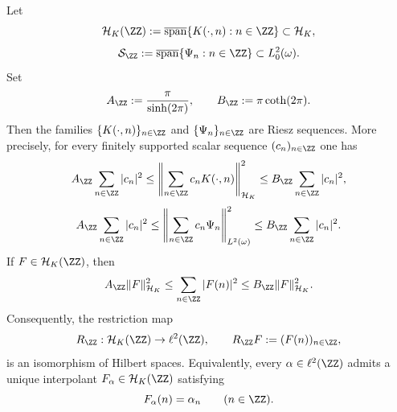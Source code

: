\begin{theorem}%
\label{thm:poisson-lattice-sampling}
Let
\[
\mathcal H_K(\ZZ)
:=
\overline{\operatorname{span}}\{K(\cdot,n):n\in\ZZ\}
\subset \mathcal H_K,
\]
\[
\mathcal S_{\ZZ}
:=
\overline{\operatorname{span}}\{\Psi_n:n\in\ZZ\}
\subset L^2_0(\omega).
\]
Set
\begin{equation}\label{eq:lattice-sampling-constants}
A_{\ZZ}:=\frac{\pi}{\sinh(2\pi)},
\qquad
B_{\ZZ}:=\pi\coth(2\pi).
\end{equation}
Then the families $\{K(\cdot,n)\}_{n\in\ZZ}$ and
$\{\Psi_n\}_{n\in\ZZ}$ are Riesz sequences.  More precisely, for every
finitely supported scalar sequence $(c_n)_{n\in\ZZ}$ one has
\begin{equation}\label{eq:lattice-riesz-kernel}
A_{\ZZ}\sum_{n\in\ZZ}|c_n|^2
\le
\left\|
\sum_{n\in\ZZ}c_nK(\cdot,n)
\right\|_{\mathcal H_K}^2
\le
B_{\ZZ}\sum_{n\in\ZZ}|c_n|^2,
\end{equation}
\begin{equation}\label{eq:lattice-riesz-secant}
A_{\ZZ}\sum_{n\in\ZZ}|c_n|^2
\le
\left\|
\sum_{n\in\ZZ}c_n\Psi_n
\right\|_{L^2(\omega)}^2
\le
B_{\ZZ}\sum_{n\in\ZZ}|c_n|^2.
\end{equation}
If $F\in\mathcal H_K(\ZZ)$, then
\begin{equation}\label{eq:lattice-sampling-HK}
A_{\ZZ}\|F\|_{\mathcal H_K}^2
\le
\sum_{n\in\ZZ}|F(n)|^2
\le
B_{\ZZ}\|F\|_{\mathcal H_K}^2.
\end{equation}
Consequently, the restriction map
\[
R_{\ZZ}:\mathcal H_K(\ZZ)\to \ell^2(\ZZ),
\qquad
R_{\ZZ}F:=(F(n))_{n\in\ZZ},
\]
is an isomorphism of Hilbert spaces.  Equivalently, every
$\alpha\in\ell^2(\ZZ)$ admits a unique interpolant
$F_\alpha\in\mathcal H_K(\ZZ)$ satisfying
\[
F_\alpha(n)=\alpha_n
\qquad(n\in\ZZ).
\]
\end{theorem}

